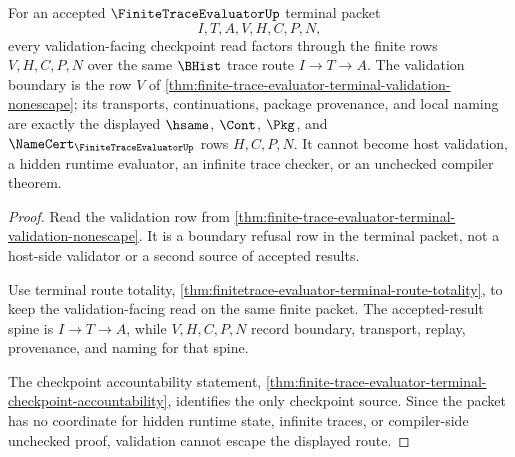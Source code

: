 \begin{theorem}
\label{thm:finite-trace-evaluator-terminal-validation-route}
For an accepted $\FiniteTraceEvaluatorUp$ terminal packet
$$
I,T,A,V,H,C,P,N,
$$
every validation-facing checkpoint read factors through the finite rows $V,H,C,P,N$ over the same $\BHist$ trace route $I \to T \to A$. The validation boundary is the row $V$ of \autoref{thm:finite-trace-evaluator-terminal-validation-nonescape}; its transports, continuations, package provenance, and local naming are exactly the displayed $\hsame$, $\Cont$, $\Pkg$, and $\NameCert_{\FiniteTraceEvaluatorUp}$ rows $H,C,P,N$. It cannot become host validation, a hidden runtime evaluator, an infinite trace checker, or an unchecked compiler theorem.
\end{theorem}
\begin{proof}
Read the validation row from \autoref{thm:finite-trace-evaluator-terminal-validation-nonescape}. It is a boundary refusal row in the terminal packet, not a host-side validator or a second source of accepted results.

Use terminal route totality, \autoref{thm:finitetrace-evaluator-terminal-route-totality}, to keep the validation-facing read on the same finite packet. The accepted-result spine is $I \to T \to A$, while $V,H,C,P,N$ record boundary, transport, replay, provenance, and naming for that spine.

The checkpoint accountability statement, \autoref{thm:finite-trace-evaluator-terminal-checkpoint-accountability}, identifies the only checkpoint source. Since the packet has no coordinate for hidden runtime state, infinite traces, or compiler-side unchecked proof, validation cannot escape the displayed route.
\end{proof}

